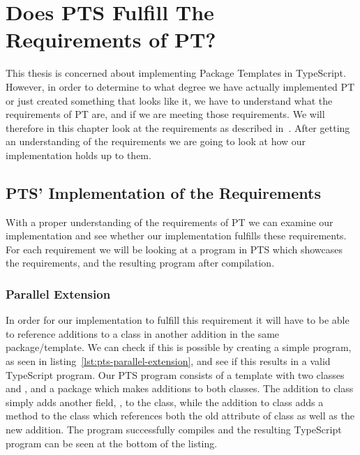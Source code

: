 \chapter{Does PTS Fulfill The Requirements of PT?}\label{ch:does-pts-fulfill-the-requirements-of-pt?}

This thesis is concerned about implementing Package Templates in TypeScript.
However, in order to determine to what degree we have actually implemented PT or just created something that looks like it, we have to understand what the requirements of PT are, and if we are meeting those requirements.
We will therefore in this chapter look at the requirements as described in~\cite{jot}.
After getting an understanding of the requirements we are going to look at how our implementation holds up to them.



\section{PTS' Implementation of the Requirements}\label{sec:pts'-implementation-of-the-requirements}

With a proper understanding of the requirements of PT we can examine our implementation and see whether our implementation fulfills these requirements.
For each requirement we will be looking at a program in PTS which showcases the requirements, and the resulting program after compilation.

\subsection{Parallel Extension}

In order for our implementation to fulfill this requirement it will have to be able to reference additions to a class in another addition in the same package/template.
We can check if this is possible by creating a simple program, as seen in listing~\vref{lst:pts-parallel-extension}, and see if this results in a valid TypeScript program.
Our PTS program consists of a template  with two classes  and , and a package  which makes additions to both classes.
The addition to class  simply adds another field, , to the class, while the addition to class  adds a method to the class which references both the old attribute of class  as well as the new addition.
The program successfully compiles and the resulting TypeScript program can be seen at the bottom of the listing.


